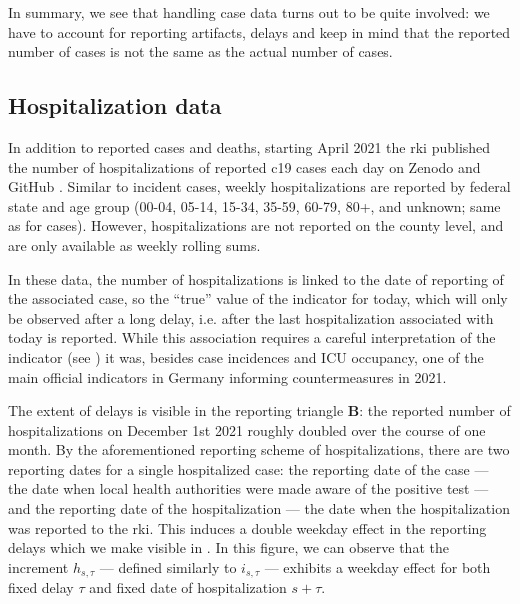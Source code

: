 In summary, we see that handling case data turns out to be quite involved: we have to account for reporting artifacts, delays and keep in mind that the reported number of cases is not the same as the actual number of cases. 

\subsection{Hospitalization data}
\label{subsec:hospitalization_data}
In addition to reported cases and deaths, starting  April 2021 the \gls{rki} published the number of hospitalizations of reported \gls{c19} cases each day on Zenodo \citep{RobertKoch-Institut2024COVID19Hospitalisierungen} and GitHub \citep{RobertKoch-Institut2024COVID19Hospitalisierungena}. 
Similar to incident cases, weekly hospitalizations are reported by federal state and age group (00-04, 05-14, 15-34, 35-59, 60-79, 80+, and unknown; same as for cases). However, hospitalizations are not reported on the county level, and are only available as weekly rolling sums.

In these data, the number of hospitalizations is linked to the date of reporting of the associated case, so the ``true'' value of the indicator for today, which will only be observed after a long delay, i.e. after the last hospitalization associated with today is reported. While this association requires a careful interpretation of the indicator (see ) it was, besides case incidences and ICU occupancy, one of the main official indicators in Germany informing countermeasures in 2021.

The extent of delays is visible in the reporting triangle  \textbf{B}: the reported number of hospitalizations on December 1st 2021 roughly doubled over the course of one month. By the aforementioned reporting scheme of hospitalizations, there are two reporting dates for a single hospitalized case: the reporting date of the case --- the date when local health authorities were made aware of the positive test --- and the reporting date of the hospitalization --- the date when the hospitalization was reported to the \gls{rki}. This induces a double weekday effect in the reporting delays which we make visible in . 
In this figure, we can observe that the increment $h_{s,\tau}$ --- defined similarly to $i_{s,\tau}$ --- exhibits a weekday effect for both fixed delay $\tau$ and fixed date of hospitalization
$s + \tau$. 

